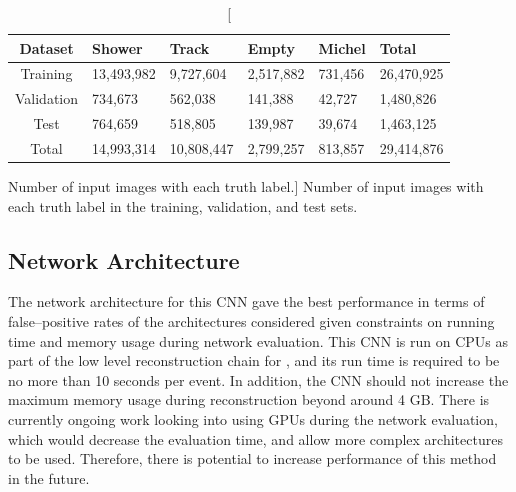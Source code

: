 \begin{table}
	\centering
	\bgroup
	\def\arraystretch{1.5}
	\begin{tabularx}{\textwidth}{@{}c|Y|Y|Y|Y|Y@{}}
		Dataset    & Shower     & Track      & Empty     & Michel  & Total      \\ \hline
		Training   & 13,493,982 & 9,727,604  & 2,517,882 & 731,456 & 26,470,925 \\
		Validation & 734,673    & 562,038    & 141,388   & 42,727  & 1,480,826  \\
		Test       & 764,659    & 518,805    & 139,987   & 39,674  & 1,463,125  \\ \hline
		Total      & 14,993,314 & 10,808,447 & 2,799,257 & 813,857 & 29,414,876
	\end{tabularx}
	\egroup
	\caption
	[Number of input images with each truth label.]
	{Number of input images with each truth label in the training, validation, and
	test sets.}
	\label{tab:patches}
\end{table}

\subsection{Network Architecture}

The network architecture for this CNN gave the best performance in terms of
false--positive rates of the architectures considered given constraints on 
running time and memory usage during network evaluation. This CNN is run on 
CPUs as part of the low level reconstruction chain for \protodune{}, and its
run time is required to be no more than 10 seconds per event. In addition, the 
CNN should not increase the maximum memory usage during reconstruction beyond 
around 4 GB. There is currently ongoing work looking into using GPUs during 
the network evaluation, which would decrease the evaluation time, and allow 
more complex architectures to be used. Therefore, there is potential to 
increase performance of this method in the future.

